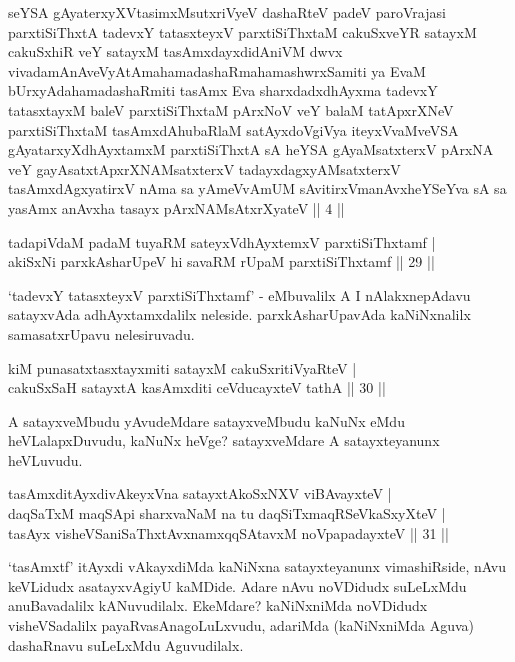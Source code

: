 \begin{shl}
seYSA gAyaterxyXVtasimxMsutxriVyeV dashaRteV padeV paroVrajasi parxtiSiThxtA tadevxY tatasxteyxV parxtiSiThxtaM cakuSxveYR satayxM cakuSxhiR veY satayxM tasAmxdayxdidAniVM dwvx vivadamAnAveVyAtAmahamadashaRmahamashwrxSamiti ya EvaM bUrxyAdahamadashaRmiti tasAmx Eva sharxdadxdhAyxma tadevxY tatasxtayxM baleV parxtiSiThxtaM pArxNoV veY balaM tatApxrXNeV parxtiSiThxtaM tasAmxdAhubaRlaM satAyxdoVgiVya iteyxVvaMveVSA gAyatarxyXdhAyxtamxM parxtiSiThxtA sA heYSA gAyaMsatxterxV pArxNA veY gayAsatxtApxrXNAMsatxterxV tadayxdagxyAMsatxterxV tasAmxdAgxyatirxV nAma sa yAmeVvAmUM sAvitirxVmanAvxheYSeYva sA sa yasAmx anAvxha tasayx pArxNAMsAtxrXyateV || 4 ||
\end{shl}


\begin{shl}
tadapiVdaM padaM tuyaRM sateyxV\s dhAyxtemxV parxtiSiThxtamf | \\
akiSxNi parxkAsharUpeV hi savaRM rUpaM parxtiSiThxtamf \hfill ||  29 ||
\end{shl}

\begin{artha} 
`tadevxY tatasxteyxV parxtiSiThxtamf' - eMbuvalilx A I nAlakxnepAdavu 
satayxvAda adhAyxtamxdalilx neleside. parxkAsharUpavAda kaNiNxnalilx 
samasatxrUpavu nelesiruvadu.
\end{artha}


\begin{shl}
kiM punasatxtasxtayxmiti satayxM cakuSxritiVyaRteV | \\
cakuSxSaH satayxtA kasAmxditi ceVducayxteV tathA \hfill ||  30 || 
\end{shl}

\begin{artha} 
A satayxveMbudu yAvudeMdare satayxveMbudu kaNuNx eMdu heVLalapxDuvudu, 
kaNuNx heVge? satayxveMdare A satayxteyanunx heVLuvudu.
\end{artha}

\begin{shl}
tasAmxditAyxdivAkeyxVna satayxtA\s koSxNXV viBAvayxteV | \\
daqSaTxM maqSA\s pi sharxvaNaM na tu daqSiTxmaqRSeVkaSxyXteV | \\
tasAyx visheVSaniSaThxtAvxnamxqqSAtavxM noVpapadayxteV \hfill ||  31 || 
\end{shl}

\begin{artha} 
`tasAmxtf' itAyxdi vAkayxdiMda kaNiNxna satayxteyanunx vimashiRside, 
nAvu keVLidudx asatayxvAgiyU kaMDide. Adare nAvu noVDidudx suLeLxMdu 
anuBavadalilx kANuvudilalx. EkeMdare? kaNiNxniMda noVDidudx 
visheVSadalilx payaRvasAnagoLuLxvudu, adariMda (kaNiNxniMda Aguva) 
dashaRnavu suLeLxMdu Aguvudilalx.
\end{artha}

